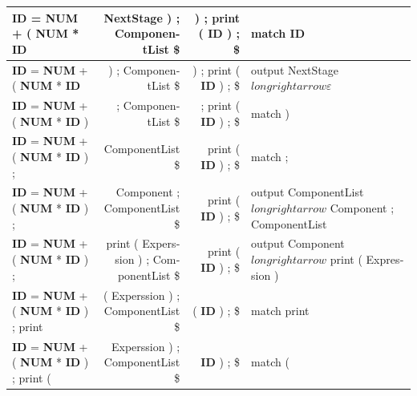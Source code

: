 \documentclass{article}
\begin{document}
\begin{latin}
\begin{table}[H]
{\begin{tabular}{|l|r|r|l|}
\textbf{ID} = \textbf{NUM} + ( \textbf{NUM} * \textbf{ID}                             & NextStage ) ; ComponentList \$              & ) ; print ( \textbf{ID} ) ; \$                                                           & match \textbf{ID}                                               \\ \hline
\textbf{ID} = \textbf{NUM} + ( \textbf{NUM} * \textbf{ID}                             & ) ; ComponentList \$                        & ) ; print ( \textbf{ID} ) ; \$                                                           & output NextStage $longrightarrow \varepsilon$                   \\ \hline
\textbf{ID} = \textbf{NUM} + ( \textbf{NUM} * \textbf{ID} )                           & ; ComponentList \$                          & ; print ( \textbf{ID} ) ; \$                                                             & match )                                                         \\ \hline
\textbf{ID} = \textbf{NUM} + ( \textbf{NUM} * \textbf{ID} ) ;                         & ComponentList \$                            & print ( \textbf{ID} ) ; \$                                                               & match ;                                                         \\ \hline
\textbf{ID} = \textbf{NUM} + ( \textbf{NUM} * \textbf{ID} ) ;                         & Component ; ComponentList \$                & print ( \textbf{ID} ) ; \$                                                               & output ComponentList $longrightarrow$ Component ; ComponentList \\ \hline
\textbf{ID} = \textbf{NUM} + ( \textbf{NUM} * \textbf{ID} ) ;                         & print ( Experssion ) ; ComponentList \$     & print ( \textbf{ID} ) ; \$                                                               & output Component $longrightarrow$ print ( Expression )          \\ \hline
\textbf{ID} = \textbf{NUM} + ( \textbf{NUM} * \textbf{ID} ) ; print                   & ( Experssion ) ; ComponentList \$           & ( \textbf{ID} ) ; \$                                                                     & match print                                                     \\ \hline
\textbf{ID} = \textbf{NUM} + ( \textbf{NUM} * \textbf{ID} ) ; print (                 & Experssion ) ; ComponentList \$             & \textbf{ID} ) ; \$                                                                       & match (                                                         \\ \hline

\end{tabular}}
\end{table}
\end{latin}
\end{document}
